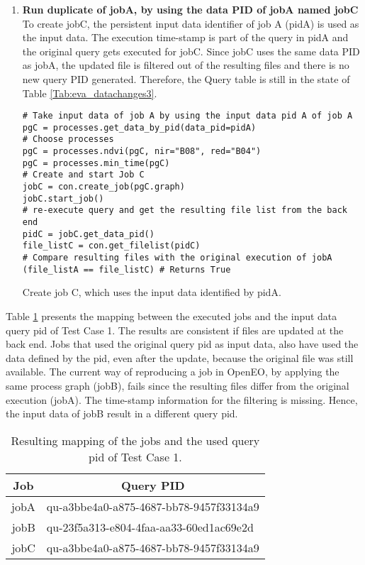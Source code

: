 \documentclass[draft,final]{vutinfth} %
\newenvironment{code}{\captionsetup{type=listing}}{}
\begin{document}
\begin{enumerate}
	\item \textbf{Run duplicate of jobA, by using the data PID of jobA named jobC}\\
To create jobC, the persistent input data identifier of job A (pidA) is used as the input data. The execution time-stamp is part of the query in pidA and the original query gets executed for jobC. Since jobC uses the same data PID as jobA, the updated file is filtered out of the resulting files and there is no new query PID generated. Therefore, the Query table is still in the state of Table \ref{Tab:eva_datachanges3}. 
	\begin{code}
		\begin{verbatim}
# Take input data of job A by using the input data pid A of job A
pgC = processes.get_data_by_pid(data_pid=pidA)
# Choose processes
pgC = processes.ndvi(pgC, nir="B08", red="B04")
pgC = processes.min_time(pgC)
# Create and start Job C
jobC = con.create_job(pgC.graph)
jobC.start_job()
# re-execute query and get the resulting file list from the back end
pidC = jobC.get_data_pid()
file_listC = con.get_filelist(pidC)
# Compare resulting files with the original execution of jobA
(file_listA == file_listC) # Returns True
		\end{verbatim}
		\caption{Create job C, which uses the input data identified by pidA.}
		\label{lst:eva_datachange_5}
	\end{code}
\end{enumerate}

Table \ref{Tab:eva_datachanges4} presents the mapping between the executed jobs and the input data query pid of Test Case 1. The results are consistent if files are updated at the back end. Jobs that used the original query pid as input data, also have used the data defined by the pid, even after the update, because the original file was still available. The current way of reproducing a job in OpenEO, by applying the same process graph (jobB), fails since the resulting files differ from the original execution (jobA). The time-stamp information for the filtering is missing. Hence,  the input data of jobB result in a different query pid.     

	\begin{table}[]
	\caption{Resulting mapping of the jobs and the used query pid of Test Case 1.}
	\centering
	\begin{tabular}{|r|l|}
		\hline \multicolumn{1}{|c|}{\textbf{Job}}  &  \multicolumn{1}{c|}{\textbf{Query PID}} \\ \hline
		jobA & qu-a3bbe4a0-a875-4687-bb78-9457f33134a9  \\ 
		jobB & qu-23f5a313-e804-4faa-aa33-60ed1ac69e2d \\
		jobC & qu-a3bbe4a0-a875-4687-bb78-9457f33134a9  \\ \hline
	\end{tabular}
	\label{Tab:eva_datachanges4}
\end{table}
\end{document}
